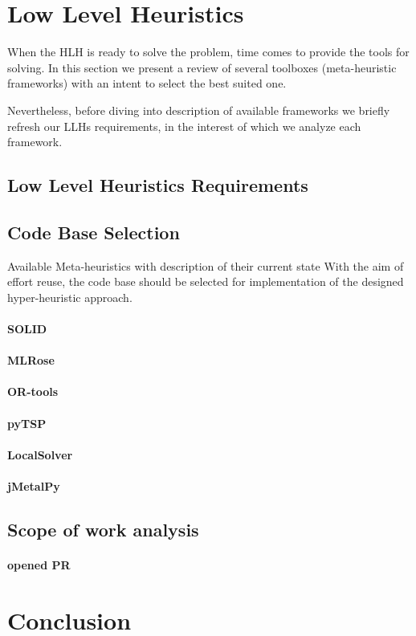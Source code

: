 \section{Low Level Heuristics}\label{impl: LLH}
When the HLH is ready to solve the problem, time comes to provide the tools for solving. In this section we present a review of several toolboxes (meta-heuristic frameworks) with an intent to select the best suited one.

Nevertheless, before diving into description of available frameworks we briefly refresh our LLHs requirements, in the interest of which we analyze each framework.

\subsection{Low Level Heuristics Requirements}


\subsection{Code Base Selection}\label{implementation:llh code basis selection}
Available Meta-heuristics with description of their current state
With the aim of effort reuse, the code base should be selected for implementation of the designed hyper-heuristic approach.
\paragraph{SOLID}
\paragraph{MLRose}
\paragraph{OR-tools}
\paragraph{pyTSP}
\paragraph{LocalSolver}
\paragraph{jMetalPy}

\subsection{Scope of work analysis}
\paragraph{opened PR}

\section{Conclusion}
